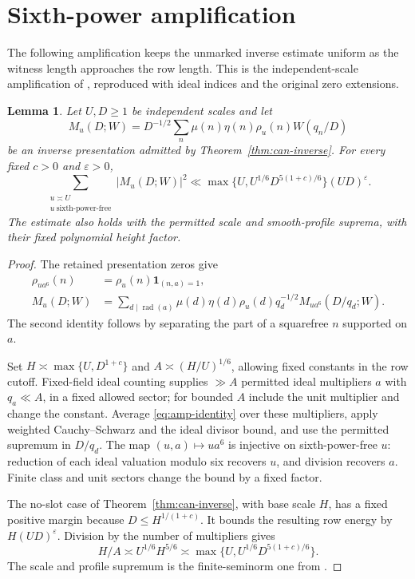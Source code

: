 \documentclass[11pt,a4paper]{article}
\numberwithin{equation}{section}
\newtheorem{lemma}[theorem]{Lemma}
\theoremstyle{definition}
\theoremstyle{remark}
\newcommand{\eps}{\varepsilon}
\newcommand{\rad}{\operatorname{rad}}
\newcommand{\ind}{\mathbf 1}
\begin{document}
\section{Sixth-power amplification}\label{sec:amplification}

The following amplification keeps the unmarked inverse estimate
uniform as the witness length approaches the row length.  This is the
independent-scale amplification of \cite[Lemma~17.6]{Q}, reproduced with
ideal indices and the original zero extensions.

\begin{lemma}\label{lem:amplification}
Let $U,D\geq1$ be independent scales and let
\[
 M_u(D;W)=D^{-1/2}\sum_n\mu(n)\eta(n)\rho_u(n)W(q_n/D)
\]
be an inverse presentation admitted by Theorem~\ref{thm:can-inverse}.
For every fixed $c>0$ and $\eps>0$,
\begin{equation}\label{eq:amplification}
 \sum_{\substack{u\asymp U\\u\ \mathrm{sixth\mbox{-}power\mbox{-}free}}}
       |M_u(D;W)|^2
 \ll\max\{U,U^{1/6}D^{5(1+c)/6}\}(UD)^\eps.
\end{equation}
The estimate also holds with the permitted scale and smooth-profile
suprema, with their fixed polynomial height factor.
\end{lemma}
\begin{proof}
The retained presentation zeros give
\begin{align}
 \rho_{ua^6}(n)&=\rho_u(n)\ind_{(n,a)=1},\label{eq:power-mask}\\
 M_u(D;W)&=\sum_{d\mid\rad(a)}
  \mu(d)\eta(d)\rho_u(d)q_d^{-1/2}
          M_{ua^6}(D/q_d;W).\label{eq:amp-identity}
\end{align}
The second identity follows by separating the part of a squarefree $n$
supported on $a$.  

Set $H\asymp\max\{U,D^{1+c}\}$ and $A\asymp(H/U)^{1/6}$, allowing
fixed constants in the row cutoff.  Fixed-field ideal counting supplies
$\gg A$ permitted ideal multipliers $a$ with $q_a\ll A$, in a fixed
allowed sector; for bounded $A$ include the unit multiplier and change the
constant.  Average \eqref{eq:amp-identity} over these multipliers, apply
weighted Cauchy--Schwarz and the ideal divisor bound, and use the permitted
supremum in $D/q_d$.  The map $(u,a)\mapsto ua^6$ is injective on
sixth-power-free $u$: reduction of each ideal valuation modulo six recovers
$u$, and division recovers $a$.  Finite class and unit sectors change the
bound by a fixed factor.

The no-slot case of Theorem~\ref{thm:can-inverse}, with base scale $H$,
has a fixed positive margin because $D\leq H^{1/(1+c)}$.
It bounds the resulting row energy by $H(UD)^\eps$.  Division by the
number of multipliers gives
\[
 H/A\asymp U^{1/6}H^{5/6}
       \asymp\max\{U,U^{1/6}D^{5(1+c)/6}\}.
\]
The scale and profile supremum is the finite-seminorm one from
\cite[Lemma~4.5]{Q}.
\end{proof}
\end{document}
